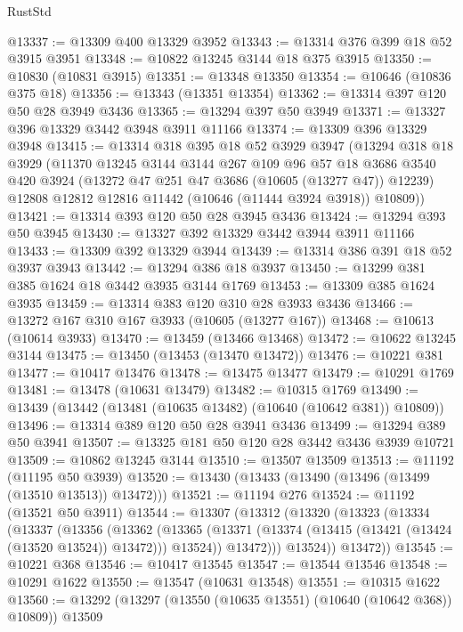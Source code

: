 \begin{lexlean}{RustStd}
\begin{coremodule}
@13337 := @13309 @400 @13329 @3952
@13343 := @13314 @376 @399 @18 @52 @3915 @3951
@13348 := @10822 @13245 @3144 @18 @375 @3915
@13350 := @10830 (@10831 @3915)
@13351 := @13348 @13350
@13354 := @10646 (@10836 @375 @18)
@13356 := @13343 (@13351 @13354)
@13362 := @13314 @397 @120 @50 @28 @3949 @3436
@13365 := @13294 @397 @50 @3949
@13371 := @13327 @396 @13329 @3442 @3948 @3911 @11166
@13374 := @13309 @396 @13329 @3948
@13415 := @13314
    @318
    @395
    @18
    @52
    @3929
    @3947
    (@13294
      @318
      @18
      @3929
      (@11370
        @13245
        @3144
        @3144
        @267
        @109
        @96
        @57
        @18
        @3686
        @3540
        @420
        @3924
        (@13272 @47 @251 @47 @3686 (@10605 (@13277 @47)) @12239)
        @12808
        @12812
        @12816
        @11442
        (@10646 (@11444 @3924 @3918))
        @10809))
@13421 := @13314 @393 @120 @50 @28 @3945 @3436
@13424 := @13294 @393 @50 @3945
@13430 := @13327 @392 @13329 @3442 @3944 @3911 @11166
@13433 := @13309 @392 @13329 @3944
@13439 := @13314 @386 @391 @18 @52 @3937 @3943
@13442 := @13294 @386 @18 @3937
@13450 := @13299 @381 @385 @1624 @18 @3442 @3935 @3144 @1769
@13453 := @13309 @385 @1624 @3935
@13459 := @13314 @383 @120 @310 @28 @3933 @3436
@13466 := @13272 @167 @310 @167 @3933 (@10605 (@13277 @167))
@13468 := @10613 (@10614 @3933)
@13470 := @13459 (@13466 @13468)
@13472 := @10622 @13245 @3144
@13475 := @13450 (@13453 (@13470 @13472))
@13476 := @10221 @381
@13477 := @10417 @13476
@13478 := @13475 @13477
@13479 := @10291 @1769
@13481 := @13478 (@10631 @13479)
@13482 := @10315 @1769
@13490 := @13439 (@13442 (@13481 (@10635 @13482) (@10640 (@10642 @381)) @10809))
@13496 := @13314 @389 @120 @50 @28 @3941 @3436
@13499 := @13294 @389 @50 @3941
@13507 := @13325 @181 @50 @120 @28 @3442 @3436 @3939 @10721
@13509 := @10862 @13245 @3144
@13510 := @13507 @13509
@13513 := @11192 (@11195 @50 @3939)
@13520 := @13430 (@13433 (@13490 (@13496 (@13499 (@13510 @13513)) @13472)))
@13521 := @11194 @276
@13524 := @11192 (@13521 @50 @3911)
@13544 := @13307
    (@13312
      (@13320
        (@13323
          (@13334
            (@13337
              (@13356
                (@13362
                  (@13365
                    (@13371 (@13374 (@13415 (@13421 (@13424 (@13520 @13524)) @13472))) @13524))
                  @13472)))
            @13524))
        @13472))
@13545 := @10221 @368
@13546 := @10417 @13545
@13547 := @13544 @13546
@13548 := @10291 @1622
@13550 := @13547 (@10631 @13548)
@13551 := @10315 @1622
@13560 := @13292 (@13297 (@13550 (@10635 @13551) (@10640 (@10642 @368)) @10809)) @13509

\end{coremodule}
\end{lexlean}
